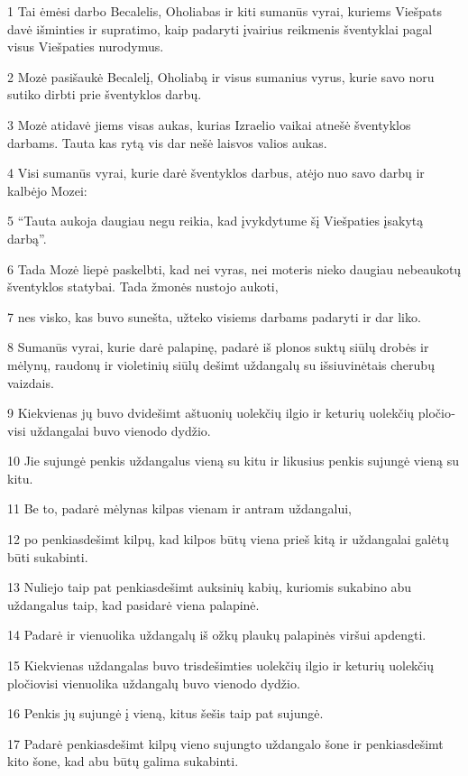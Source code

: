 \par 1 Tai ėmėsi darbo Becalelis, Oholiabas ir kiti sumanūs vyrai, kuriems Viešpats davė išminties ir supratimo, kaip padaryti įvairius reikmenis šventyklai pagal visus Viešpaties nurodymus. 
\par 2 Mozė pasišaukė Becalelį, Oholiabą ir visus sumanius vyrus, kurie savo noru sutiko dirbti prie šventyklos darbų. 
\par 3 Mozė atidavė jiems visas aukas, kurias Izraelio vaikai atnešė šventyklos darbams. Tauta kas rytą vis dar nešė laisvos valios aukas. 
\par 4 Visi sumanūs vyrai, kurie darė šventyklos darbus, atėjo nuo savo darbų ir kalbėjo Mozei: 
\par 5 “Tauta aukoja daugiau negu reikia, kad įvykdytume šį Viešpaties įsakytą darbą”. 
\par 6 Tada Mozė liepė paskelbti, kad nei vyras, nei moteris nieko daugiau nebeaukotų šventyklos statybai. Tada žmonės nustojo aukoti, 
\par 7 nes visko, kas buvo sunešta, užteko visiems darbams padaryti ir dar liko. 
\par 8 Sumanūs vyrai, kurie darė palapinę, padarė iš plonos suktų siūlų drobės ir mėlynų, raudonų ir violetinių siūlų dešimt uždangalų su išsiuvinėtais cherubų vaizdais. 
\par 9 Kiekvienas jų buvo dvidešimt aštuonių uolekčių ilgio ir keturių uolekčių pločio­visi uždangalai buvo vienodo dydžio. 
\par 10 Jie sujungė penkis uždangalus vieną su kitu ir likusius penkis sujungė vieną su kitu. 
\par 11 Be to, padarė mėlynas kilpas vienam ir antram uždangalui, 
\par 12 po penkiasdešimt kilpų, kad kilpos būtų viena prieš kitą ir uždangalai galėtų būti sukabinti. 
\par 13 Nuliejo taip pat penkiasdešimt auksinių kabių, kuriomis sukabino abu uždangalus taip, kad pasidarė viena palapinė. 
\par 14 Padarė ir vienuolika uždangalų iš ožkų plaukų palapinės viršui apdengti. 
\par 15 Kiekvienas uždangalas buvo trisdešimties uolekčių ilgio ir keturių uolekčių pločio­visi vienuolika uždangalų buvo vienodo dydžio. 
\par 16 Penkis jų sujungė į vieną, kitus šešis taip pat sujungė. 
\par 17 Padarė penkiasdešimt kilpų vieno sujungto uždangalo šone ir penkiasdešimt kito šone, kad abu būtų galima sukabinti. 
